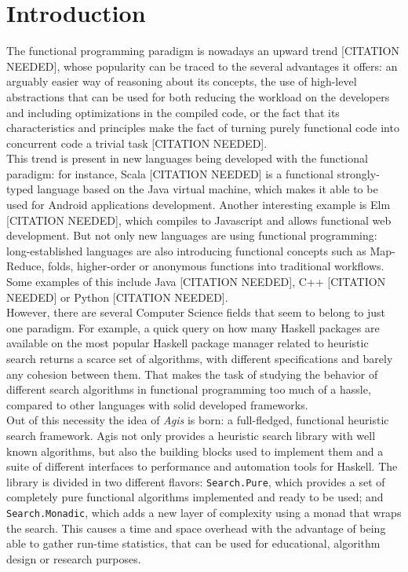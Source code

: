 \section{Introduction}

The functional programming paradigm is nowadays an upward trend [CITATION
NEEDED], whose popularity can be traced to the several advantages it offers: an
arguably easier way of reasoning about its concepts, the use of high-level
abstractions that can be used for both reducing the workload on the developers
and including optimizations in the compiled code, or the fact that its
characteristics and principles make the fact of turning purely functional code
into concurrent code a trivial task [CITATION NEEDED].\\

This trend is present in new languages being developed with the functional
paradigm: for instance, Scala [CITATION NEEDED] is a functional strongly-typed
language based on the Java virtual machine, which makes it able to be used for
Android applications development. Another interesting example is Elm [CITATION
NEEDED], which compiles to Javascript and allows functional web development.
But not only new languages are using functional programming: long-established
languages are also introducing functional concepts such as Map-Reduce, folds,
higher-order or anonymous functions into traditional workflows. Some examples
of this include Java [CITATION NEEDED], C++ [CITATION NEEDED] or Python
[CITATION NEEDED].\\


However, there are several Computer Science fields that seem to belong to just
one paradigm. For example, a quick query on how many Haskell packages are
available on the most popular Haskell package manager related to heuristic
search returns a scarce set of algorithms, with different specifications and
barely any cohesion between them. That makes the task of studying the behavior
of different search algorithms in functional programming too much of a hassle,
compared to other languages with solid developed frameworks.\\

Out of this necessity the idea of \emph{Agis} is born: a full-fledged,
functional heuristic search framework. Agis not only provides a heuristic
search library with well known algorithms, but also the building blocks used to
implement them and a suite of different interfaces to performance and
automation tools for Haskell. The library is divided in two different flavors:
\texttt{Search.Pure}, which provides a set of completely pure functional
algorithms implemented and ready to be used; and \texttt{Search.Monadic}, which
adds a new layer of complexity using a monad that wraps the search. This causes
a time and space overhead with the advantage of being able to gather run-time
statistics, that can be used for educational, algorithm design or research
purposes.

\newpage